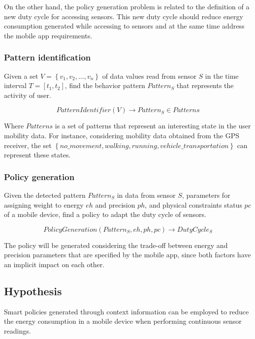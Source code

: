 On the other hand, the policy generation problem is related to the definition of a new duty cycle for accessing sensors.
This new duty cycle should reduce energy consumption generated while accessing to sensors and at the same time address the mobile app requirements.
\subsubsection{Pattern identification}
\label{ssub:pattern_identification}
Given a set $V = \left\{v_{1}, v_{2}, \dotsc, v_{n}\right\}$ of data values read from sensor $S$ in the time interval $T = [t_{1}, t_{2}]$, find the behavior pattern $Pattern_{S}$ that represents the activity of user.

\begin{equation}
  PatternIdentifier( V ) \longrightarrow{} Pattern_{S} \in Patterns
\end{equation}

Where $Patterns$ is a set of patterns that represent an interesting state in the user mobility data.
For instance, considering mobility data obtained from the GPS receiver, the set $\left\{no\_movement, walking, running, vehicle\_transportation\right\}$ can represent these states.


\subsubsection{Policy generation}
\label{ssub:policy_generation}

Given the detected pattern $Pattern_{S}$ in data from sensor $S$, parameters for assigning weight to energy $eh$ and precision $ph$, and physical constraints status $pc$ of a mobile device, find a policy to adapt the duty cycle of sensors.

\begin{equation}
  PolicyGeneration( Pattern_{S}, eh, ph, pc ) \longrightarrow{} DutyCycle_{S}
\end{equation}

The policy will be generated considering the trade-off between energy and precision parameters that are specified by the mobile app, since both factors have an implicit impact on each other.


\subsection{Hypothesis} 
\label{sub:hypothesis}
Smart policies generated through context information can be employed to reduce the energy consumption in a mobile device when performing continuous sensor readings.

